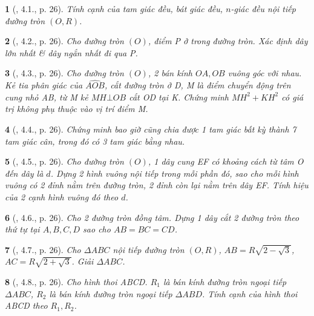 \documentclass{article}
\newtheorem{baitoan}{}
\begin{document}
\begin{baitoan}[\cite{TLCT_THCS_Toan_9_hinh_hoc}, 4.1., p. 26]
	Tính cạnh của tam giác đều, bát giác đều, $n$-giác đều nội tiếp đường tròn $(O,R)$.
\end{baitoan}

\begin{baitoan}[\cite{TLCT_THCS_Toan_9_hinh_hoc}, 4.2., p. 26]
	Cho đường tròn $(O)$, điểm P ở trong đường tròn. Xác định dây lớn nhất \& dây ngắn nhất đi qua P.
\end{baitoan}

\begin{baitoan}[\cite{TLCT_THCS_Toan_9_hinh_hoc}, 4.3., p. 26]
	Cho đường tròn $(O)$, 2 bán kính $OA,OB$ vuông góc với nhau. Kẻ tia phân giác của $\widehat{AOB}$, cắt đường tròn ở D, M là điểm chuyển động trên cung nhỏ AB, từ M kẻ $MH\bot OB$ cắt OD tại K. Chứng minh $MH^2 + KH^2$ có giá trị không phụ thuộc vào vị trí điểm M.
\end{baitoan}

\begin{baitoan}[\cite{TLCT_THCS_Toan_9_hinh_hoc}, 4.4., p. 26]
	Chứng minh bao giờ cũng chia được 1 tam giác bất kỳ thành 7 tam giác cân, trong đó có 3 tam giác bằng nhau.
\end{baitoan}

\begin{baitoan}[\cite{TLCT_THCS_Toan_9_hinh_hoc}, 4.5., p. 26]
	Cho đường tròn $(O)$, 1 dây cung EF có khoảng cách từ tâm O đến dây là $d$. Dựng 2 hình vuông nội tiếp trong mỗi phần đó, sao cho mỗi hình vuông có 2 đỉnh nằm trên đường tròn, 2 đỉnh còn lại nằm trên dây EF. Tính hiệu của 2 cạnh hình vuông đó theo $d$.
\end{baitoan}

\begin{baitoan}[\cite{TLCT_THCS_Toan_9_hinh_hoc}, 4.6., p. 26]
	Cho 2 đường tròn đồng tâm. Dựng 1 dây cắt 2 đường tròn theo thứ tự tại $A,B,C,D$ sao cho $AB = BC = CD$.
\end{baitoan}

\begin{baitoan}[\cite{TLCT_THCS_Toan_9_hinh_hoc}, 4.7., p. 26]
	Cho $\Delta ABC$ nội tiếp đường tròn $(O,R)$, $AB = R\sqrt{2 - \sqrt{3}}$, $AC = R\sqrt{2 + \sqrt{3}}$. Giải $\Delta ABC$.
\end{baitoan}

\begin{baitoan}[\cite{TLCT_THCS_Toan_9_hinh_hoc}, 4.8., p. 26]
	Cho hình thoi ABCD. $R_1$ là bán kính đường tròn ngoại tiếp $\Delta ABC$, $R_2$ là bán kính đường tròn ngoại tiếp $\Delta ABD$. Tính cạnh của hình thoi ABCD theo $R_1,R_2$.
\end{baitoan}
\end{document}

